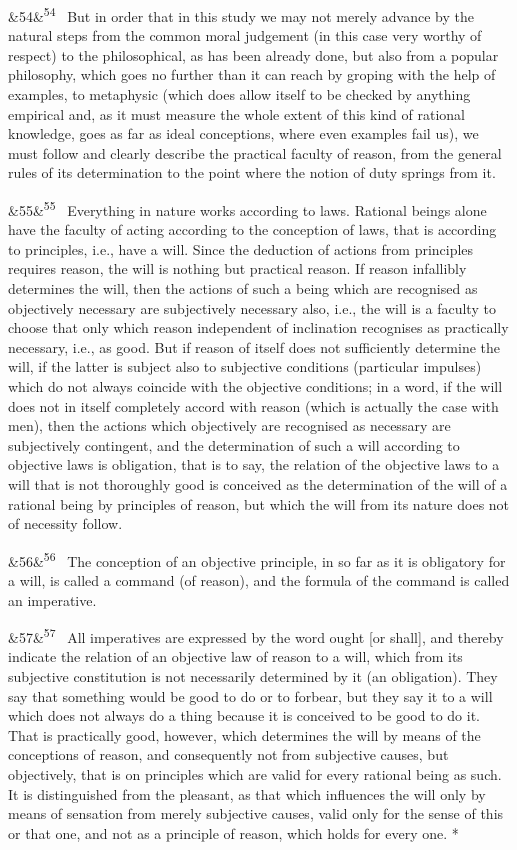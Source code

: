 \documentclass[12pt]{article}
\newcommand{\para}[1][]{\par\noindent\ifx&#1&\else\textsuperscript{\footnotesize #1}~\fi}
\begin{document}
\para[54] But in order that in this study we may not merely advance by the natural steps from the common moral judgement (in this case very worthy of respect) to the philosophical, as has been already done, but also from a popular philosophy, which goes no further than it can reach by groping with the help of examples, to metaphysic (which does allow itself to be checked by anything empirical and, as it must measure the whole extent of this kind of rational knowledge, goes as far as ideal conceptions, where even examples fail us), we must follow and clearly describe the practical faculty of reason, from the general rules of its determination to the point where the notion of duty springs from it.

\para[55] Everything in nature works according to laws. Rational beings alone have the faculty of acting according to the conception of laws, that is according to principles, i.e., have a will. Since the deduction of actions from principles requires reason, the will is nothing but practical reason. If reason infallibly determines the will, then the actions of such a being which are recognised as objectively necessary are subjectively necessary also, i.e., the will is a faculty to choose that only which reason independent of inclination recognises as practically necessary, i.e., as good. But if reason of itself does not sufficiently determine the will, if the latter is subject also to subjective conditions (particular impulses) which do not always coincide with the objective conditions; in a word, if the will does not in itself completely accord with reason (which is actually the case with men), then the actions which objectively are recognised as necessary are subjectively contingent, and the determination of such a will according to objective laws is obligation, that is to say, the relation of the objective laws to a will that is not thoroughly good is conceived as the determination of the will of a rational being by principles of reason, but which the will from its nature does not of necessity follow.

\para[56] The conception of an objective principle, in so far as it is obligatory for a will, is called a command (of reason), and the formula of the command is called an imperative.

\para[57] All imperatives are expressed by the word ought [or shall], and thereby indicate the relation of an objective law of reason to a will, which from its subjective constitution is not necessarily determined by it (an obligation). They say that something would be good to do or to forbear, but they say it to a will which does not always do a thing because it is conceived to be good to do it. That is practically good, however, which determines the will by means of the conceptions of reason, and consequently not from subjective causes, but objectively, that is on principles which are valid for every rational being as such. It is distinguished from the pleasant, as that which influences the will only by means of sensation from merely subjective causes, valid only for the sense of this or that one, and not as a principle of reason, which holds for every one. *
\end{document}
